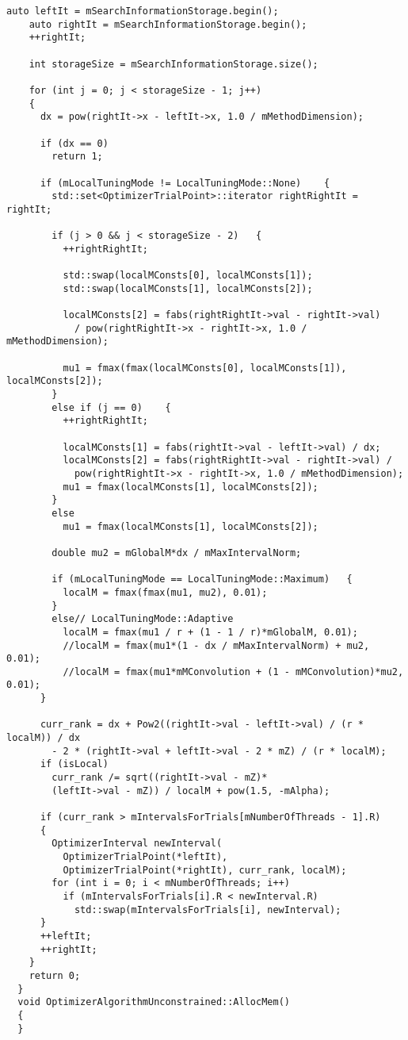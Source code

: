 \begin{lstlisting}[frame=single]
    auto leftIt = mSearchInformationStorage.begin();
    auto rightIt = mSearchInformationStorage.begin();
    ++rightIt;

    int storageSize = mSearchInformationStorage.size();

    for (int j = 0; j < storageSize - 1; j++)
    {
      dx = pow(rightIt->x - leftIt->x, 1.0 / mMethodDimension);

      if (dx == 0)
        return 1;

      if (mLocalTuningMode != LocalTuningMode::None)	{
        std::set<OptimizerTrialPoint>::iterator rightRightIt = rightIt;

        if (j > 0 && j < storageSize - 2)	{
          ++rightRightIt;

          std::swap(localMConsts[0], localMConsts[1]);
          std::swap(localMConsts[1], localMConsts[2]);

          localMConsts[2] = fabs(rightRightIt->val - rightIt->val)
            / pow(rightRightIt->x - rightIt->x, 1.0 / mMethodDimension);

          mu1 = fmax(fmax(localMConsts[0], localMConsts[1]), localMConsts[2]);
        }
        else if (j == 0)	{
          ++rightRightIt;

          localMConsts[1] = fabs(rightIt->val - leftIt->val) / dx;
          localMConsts[2] = fabs(rightRightIt->val - rightIt->val) /
            pow(rightRightIt->x - rightIt->x, 1.0 / mMethodDimension);
          mu1 = fmax(localMConsts[1], localMConsts[2]);
        }
        else
          mu1 = fmax(localMConsts[1], localMConsts[2]);

        double mu2 = mGlobalM*dx / mMaxIntervalNorm;

        if (mLocalTuningMode == LocalTuningMode::Maximum)	{
          localM = fmax(fmax(mu1, mu2), 0.01);
        }
        else// LocalTuningMode::Adaptive
          localM = fmax(mu1 / r + (1 - 1 / r)*mGlobalM, 0.01);
          //localM = fmax(mu1*(1 - dx / mMaxIntervalNorm) + mu2, 0.01);
          //localM = fmax(mu1*mMConvolution + (1 - mMConvolution)*mu2, 0.01);
      }

      curr_rank = dx + Pow2((rightIt->val - leftIt->val) / (r * localM)) / dx
        - 2 * (rightIt->val + leftIt->val - 2 * mZ) / (r * localM);
      if (isLocal)
        curr_rank /= sqrt((rightIt->val - mZ)*
        (leftIt->val - mZ)) / localM + pow(1.5, -mAlpha);

      if (curr_rank > mIntervalsForTrials[mNumberOfThreads - 1].R)
      {
        OptimizerInterval newInterval(
          OptimizerTrialPoint(*leftIt),
          OptimizerTrialPoint(*rightIt), curr_rank, localM);
        for (int i = 0; i < mNumberOfThreads; i++)
          if (mIntervalsForTrials[i].R < newInterval.R)
            std::swap(mIntervalsForTrials[i], newInterval);
      }
      ++leftIt;
      ++rightIt;
    }
    return 0;
  }
  void OptimizerAlgorithmUnconstrained::AllocMem()
  {
  }
\end{lstlisting}

